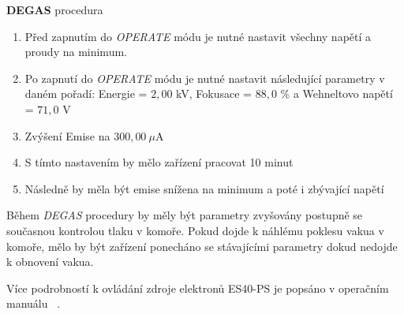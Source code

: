 \textbf{DEGAS} procedura
\begin{enumerate}
\item Před zapnutím do \textit{OPERATE} módu je nutné nastavit všechny napětí a proudy na minimum. 
\item Po zapnutí do \textit{OPERATE} módu je nutné nastavit následující parametry v daném pořadí: Energie = $2{,}00$ kV, Fokusace = $88{,}0$ \% a Wehneltovo napětí = $71{,}0$ V
\item Zvýšení Emise na $300{,}00 \ \mu$A 
\item S tímto nastavením by mělo zařízení pracovat 10 minut
\item Následně by měla být emise snížena na minimum a poté i zbývající napětí
\end{enumerate}
Během \textit{DEGAS} procedury by měly být parametry zvyšovány postupně se současnou kontrolou tlaku v komoře. Pokud dojde k náhlému poklesu vakua v komoře, mělo by být zařízení ponecháno se stávajícími parametry dokud nedojde k obnovení vakua.

Více podrobností k ovládání zdroje elektronů ES40-PS je popsáno v operačním manuálu ~\cite{Manual}.